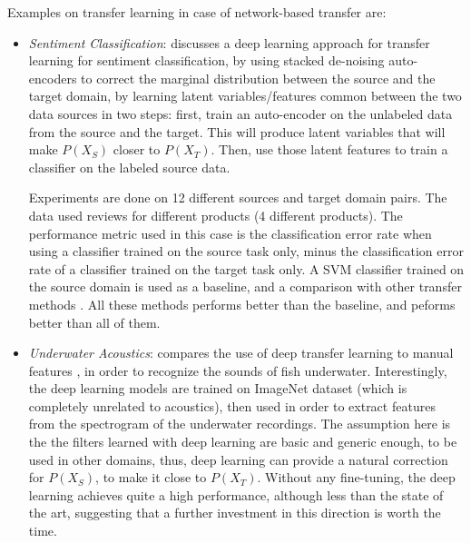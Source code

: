     \par Examples on transfer learning in case of network-based transfer are:
    \begin{itemize}
      \item \textit{Sentiment Classification}: \citep{glorot2011domain} discusses a deep learning approach for transfer learning for sentiment classification, by using stacked de-noising auto-encoders \citep{vincent2008extracting} to correct the marginal distribution between the source and the target domain, by learning latent variables/features common between the two data sources in two steps: first, train an auto-encoder on the unlabeled data from the source and the target. This will produce latent variables that will make $P(X_S)$ closer to $P(X_T)$. Then, use those latent features to train a classifier on the labeled source data.

      Experiments are done on 12 different sources and target domain pairs. The data used reviews for different products (4 different products). The performance metric used in this case is the classification error rate when using a classifier trained on the source task only, minus the classification error rate of a classifier trained on the target task only. A SVM classifier trained on the source domain is used as a baseline, and a comparison with other transfer methods \citep{blitzer2006domain,li2008multi,pan2010cross}. All these methods performs better than the baseline, and \citep{glorot2011domain} peforms better than all of them.

      \item \textit{Underwater Acoustics}: \citep{malfante2018use} compares the use of deep transfer learning to manual features \citep{malfante2016automatic,malfante2018machine}, in order to recognize the sounds of fish underwater. Interestingly, the deep learning models are trained on ImageNet \citep{imagenet_cvpr09} dataset (which is completely unrelated to acoustics), then used in order to extract features from the spectrogram of the underwater recordings. The assumption here is the the filters learned with deep learning are basic and generic enough, to be used in other domains, thus, deep learning can provide a natural correction for $P(X_S)$, to make it close to $P(X_T)$. Without any fine-tuning, the deep learning achieves quite a high performance, although less than the state of the art, suggesting that a further investment in this direction is worth the time.


\end{itemize}
